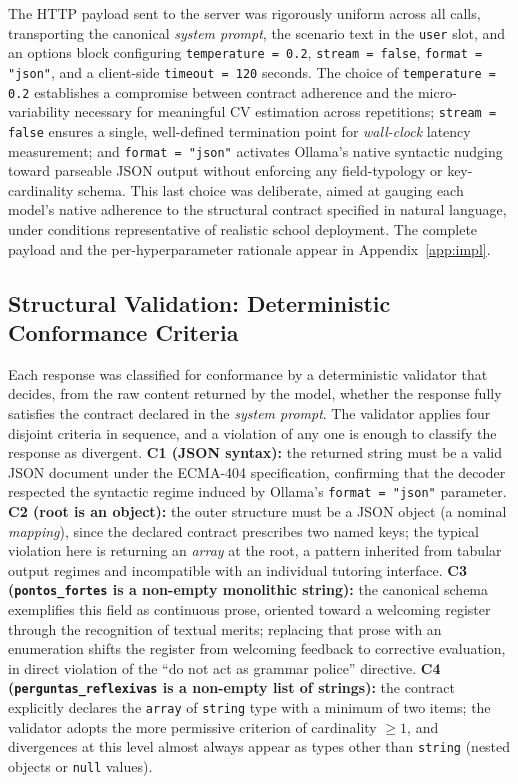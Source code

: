 \documentclass{sbc2023}%
\begin{document}
The HTTP payload sent to the server was rigorously uniform across all calls, transporting the canonical \textit{system prompt}, the scenario text in the \texttt{user} slot, and an options block configuring \texttt{temperature = 0.2}, \texttt{stream = false}, \texttt{format = "json"}, and a client-side \texttt{timeout = 120} seconds. The choice of \texttt{temperature = 0.2} establishes a compromise between contract adherence and the micro-variability necessary for meaningful CV estimation across repetitions; \texttt{stream = false} ensures a single, well-defined termination point for \textit{wall-clock} latency measurement; and \texttt{format = "json"} activates Ollama's native syntactic nudging toward parseable JSON output without enforcing any field-typology or key-cardinality schema. This last choice was deliberate, aimed at gauging each model's native adherence to the structural contract specified in natural language, under conditions representative of realistic school deployment. The complete payload and the per-hyperparameter rationale appear in Appendix~\ref{app:impl}.

\subsection{Structural Validation: Deterministic Conformance Criteria}
\label{sec:validation}

Each response was classified for conformance by a deterministic validator that decides, from the raw content returned by the model, whether the response fully satisfies the contract declared in the \textit{system prompt}. The validator applies four disjoint criteria in sequence, and a violation of any one is enough to classify the response as divergent. \textbf{C1 (JSON syntax):} the returned string must be a valid JSON document under the ECMA-404 specification, confirming that the decoder respected the syntactic regime induced by Ollama's \texttt{format = "json"} parameter. \textbf{C2 (root is an object):} the outer structure must be a JSON object (a nominal \textit{mapping}), since the declared contract prescribes two named keys; the typical violation here is returning an \textit{array} at the root, a pattern inherited from tabular output regimes and incompatible with an individual tutoring interface. \textbf{C3 (\texttt{pontos\_fortes} is a non-empty monolithic string):} the canonical schema exemplifies this field as continuous prose, oriented toward a welcoming register through the recognition of textual merits; replacing that prose with an enumeration shifts the register from welcoming feedback to corrective evaluation, in direct violation of the ``do not act as grammar police'' directive. \textbf{C4 (\texttt{perguntas\_reflexivas} is a non-empty list of strings):} the contract explicitly declares the \texttt{array} of \texttt{string} type with a minimum of two items; the validator adopts the more permissive criterion of cardinality $\geq 1$, and divergences at this level almost always appear as types other than \texttt{string} (nested objects or \texttt{null} values).
\end{document}
